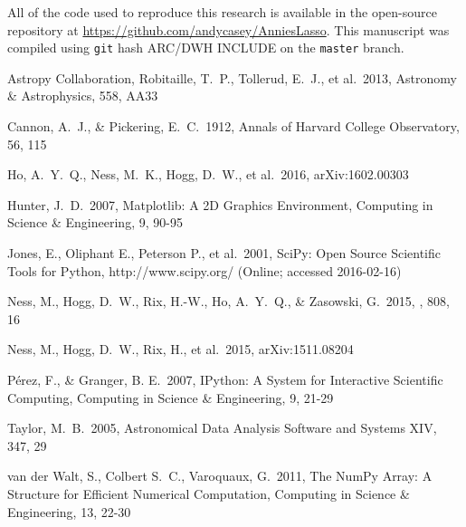 \documentclass[12pt,preprint]{aastex}
\begin{document}
All of the code used to reproduce this research is available in the
open-source repository at \url{https://github.com/andycasey/AnniesLasso}.
This manuscript was compiled using \texttt{git} hash ARC/DWH INCLUDE
on the \texttt{master} branch.



\begin{thebibliography}{dummy}\raggedright
{} Astropy Collaboration, Robitaille, T.~P., Tollerud, E.~J., et al.\ 2013, Astronomy \& Astrophysics, 558, AA33 

 Cannon, A.~J., \& Pickering, E.~C.\ 1912, Annals of Harvard College Observatory, 56, 115 

 Ho, A.~Y.~Q., Ness, M.~K., 
Hogg, D.~W., et al.\ 2016, arXiv:1602.00303 

 Hunter, J.~D.\ 2007, Matplotlib: A 2D Graphics Environment, Computing in Science \& Engineering, 9, 90-95

 Jones, E., Oliphant E., Peterson P., et al.\ 2001, SciPy: Open Source Scientific Tools for Python, http://www.scipy.org/ (Online; accessed 2016-02-16)

 Ness, M., Hogg, D.~W., 
Rix, H.-W., Ho, A.~Y.~Q., \& Zasowski, G.\ 2015, \apj, 808, 16

 Ness, M., Hogg, D.~W., 
Rix, H., et al.\ 2015, arXiv:1511.08204 

 P\'erez, F., \& Granger, B. E.\ 2007, IPython: A System for Interactive Scientific Computing, Computing in Science \& Engineering, 9, 21-29

 Taylor, M.~B.\ 2005, Astronomical Data Analysis Software and Systems XIV, 347, 29 

 van der Walt, S., Colbert S.~C., Varoquaux, G.\ 2011, The NumPy Array: A Structure for Efficient Numerical Computation, Computing in Science \& Engineering, 13, 22-30


\end{thebibliography}

\clearpage
\end{document}
